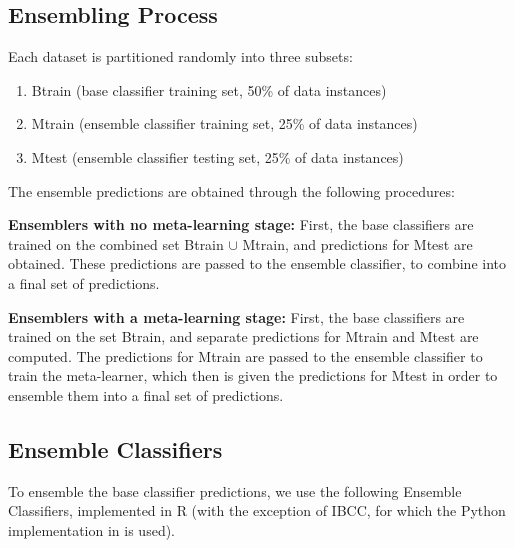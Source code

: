\documentclass{bioinfo}
\begin{document}
\begin{methods}
\subsection{Ensembling Process}
\label{ensemblingprocess}

Each dataset is partitioned randomly into three subsets:
\begin{enumerate}
\item Btrain (base classifier training set, 50\% of data instances)
\item Mtrain (ensemble classifier training set, 25\% of data instances)
\item Mtest (ensemble classifier testing set, 25\% of data instances)
\end{enumerate}

\noindent
The ensemble predictions are obtained through the following procedures:

\vspace{1cm}
\noindent
\textbf{Ensemblers with no meta-learning stage:}
First, the base classifiers are trained on the combined set Btrain $\cup$ Mtrain, and predictions for Mtest are obtained. These predictions are passed to the ensemble classifier, to combine into a final set of predictions.

\noindent
\textbf{Ensemblers with a meta-learning stage:}
First, the base classifiers are trained on the set Btrain, and separate predictions for Mtrain and Mtest are computed. The predictions for Mtrain are passed to the ensemble classifier to train the meta-learner, which then is given the predictions for Mtest in order to ensemble them into a final set of predictions.

\subsection{Ensemble Classifiers}

To ensemble the base classifier predictions, we use the following Ensemble Classifiers, implemented in R (with the exception of IBCC, for which the Python implementation in \cite{Simpson13} is used).


\end{methods}
\end{document}
